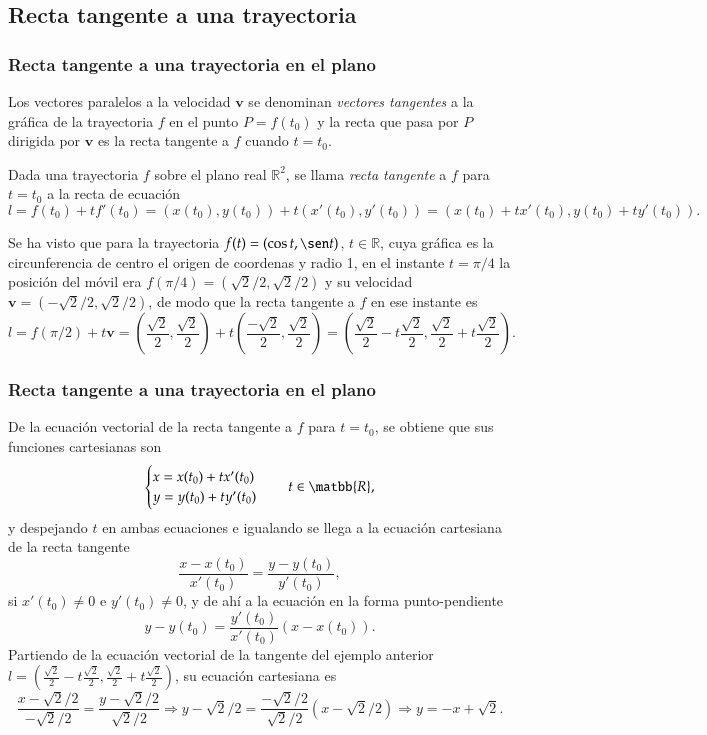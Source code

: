 \subsection{Recta tangente a una trayectoria}
\begin{frame}
\frametitle{Recta tangente a una trayectoria en el plano}
Los vectores paralelos a la velocidad $\mathbf{v}$ se denominan \emph{vectores tangentes} a la gráfica de la trayectoria
$f$ en el punto $P=f(t_0)$ y la recta que pasa por $P$ dirigida por $\mathbf{v}$ es la recta tangente a $f$ cuando
$t=t_0$.
\begin{definicion}
Dada una trayectoria $f$ sobre el plano real $\mathbb{R}^2$, se llama \emph{recta tangente} a $f$ para $t=t_0$ a la
recta de ecuación
\[
l = f(t_0)+tf'(t_0) = (x(t_0),y(t_0))+t(x'(t_0),y'(t_0)) = (x(t_0)+tx'(t_0),y(t_0)+ty'(t_0)). 
\]
\end{definicion}
Se ha visto que para la trayectoria $f(t) = (\cos t,\sen t)$, $t\in \mathbb{R}$, cuya gráfica es la circunferencia de
centro el origen de coordenas y radio 1, en el instante $t=\pi/4$ la posición del móvil era
$f(\pi/4)=(\sqrt{2}/2,\sqrt{2}/2)$ y su velocidad $\mathbf{v}=(-\sqrt{2}/2,\sqrt{2}/2)$, de modo que la recta tangente a
$f$ en ese instante es
\[
l=f(\pi/2)+t\mathbf{v} = 
\left(\frac{\sqrt{2}}{2},\frac{\sqrt{2}}{2}\right)+t\left(\frac{-\sqrt{2}}{2},\frac{\sqrt{2}}{2}\right) = 
\left(\frac{\sqrt{2}}{2}-t\frac{\sqrt{2}}{2},\frac{\sqrt{2}}{2}+t\frac{\sqrt{2}}{2}\right).
\]
\end{frame}


\begin{frame}
\frametitle{Recta tangente a una trayectoria en el plano}
De la ecuación vectorial de la recta tangente a $f$ para $t=t_0$, se obtiene que sus funciones cartesianas son
\[
\begin{cases}
x=x(t_0)+tx'(t_0)\\
y=y(t_0)+ty'(t_0)
\end{cases}
\quad t\in \matbb{R},
\]
y despejando $t$ en ambas ecuaciones e igualando se llega a la ecuación cartesiana de la recta tangente
\[
\frac{x-x(t_0)}{x'(t_0)}=\frac{y-y(t_0)}{y'(t_0)},
\]
si $x'(t_0)\neq 0$ e $y'(t_0)\neq 0$, y de ahí a la ecuación en la forma punto-pendiente
\[
y-y(t_0)=\frac{y'(t_0)}{x'(t_0)}(x-x(t_0)).
\]
Partiendo de la ecuación vectorial de la tangente del ejemplo anterior
$l=\left(\frac{\sqrt{2}}{2}-t\frac{\sqrt{2}}{2},\frac{\sqrt{2}}{2}+t\frac{\sqrt{2}}{2}\right)$, su ecuación cartesiana
es
\[
\frac{x-\sqrt{2}/2}{-\sqrt{2}/2} = \frac{y-\sqrt{2}/2}{\sqrt{2}/2}\Rightarrow y-\sqrt{2}/2 =
\frac{-\sqrt{2}/2}{\sqrt{2}/2}(x-\sqrt{2}/2) \Rightarrow y=-x+\sqrt{2}.
\]
\end{frame}



